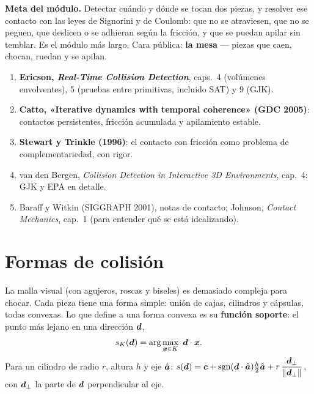 \documentclass[11pt,a4paper]{article}
\begin{document}
\maketitle
\vspace{-2.5em}

\begin{meta}
\textbf{\textcolor{amarillo}{Meta del módulo.}} Detectar cuándo y dónde se tocan dos piezas, y resolver ese contacto
con las leyes de Signorini y de Coulomb: que no se atraviesen, que no se peguen, que deslicen o se adhieran según la
fricción, y que se puedan apilar sin temblar. Es el módulo más largo. Cara pública: \textbf{la mesa} — piezas que
caen, chocan, ruedan y se apilan.
\end{meta}

\begin{lectura}
\begin{enumerate}[leftmargin=*]
  \item \textbf{Ericson, \emph{Real-Time Collision Detection}}, caps.~4 (volúmenes envolventes), 5 (pruebas entre
        primitivas, incluido SAT) y 9 (GJK).
  \item \textbf{Catto, «Iterative dynamics with temporal coherence» (GDC 2005)}: contactos persistentes, fricción
        acumulada y apilamiento estable.
  \item \textbf{Stewart y Trinkle (1996)}: el contacto con fricción como problema de complementariedad, con rigor.
  \item van den Bergen, \emph{Collision Detection in Interactive 3D Environments}, cap.~4: GJK y EPA en detalle.
  \item Baraff y Witkin (SIGGRAPH 2001), notas de contacto; Johnson, \emph{Contact Mechanics}, cap.~1 (para entender
        qué se está idealizando).
\end{enumerate}
\end{lectura}

\section{Formas de colisión}

La malla visual (con agujeros, roscas y biseles) es demasiado compleja para chocar. Cada pieza tiene una forma
simple: unión de cajas, cilindros y cápsulas, todas convexas. Lo que define a una forma convexa es su
\textbf{función soporte}: el punto más lejano en una dirección $\bm{d}$,
\begin{equation}
  s_K(\bm{d}) = \arg\max_{\bm{x}\in K}\ \bm{d}\cdot\bm{x} .
\end{equation}
Para un cilindro de radio $r$, altura $h$ y eje $\hat{\bm{a}}$:
$s(\bm{d}) = \bm{c} + \operatorname{sgn}(\bm{d}\cdot\hat{\bm{a}})\tfrac h2\hat{\bm{a}} + r\,
\dfrac{\bm{d}_\perp}{\lVert\bm{d}_\perp\rVert}$, con $\bm{d}_\perp$ la parte de $\bm{d}$ perpendicular al eje.
\end{document}
